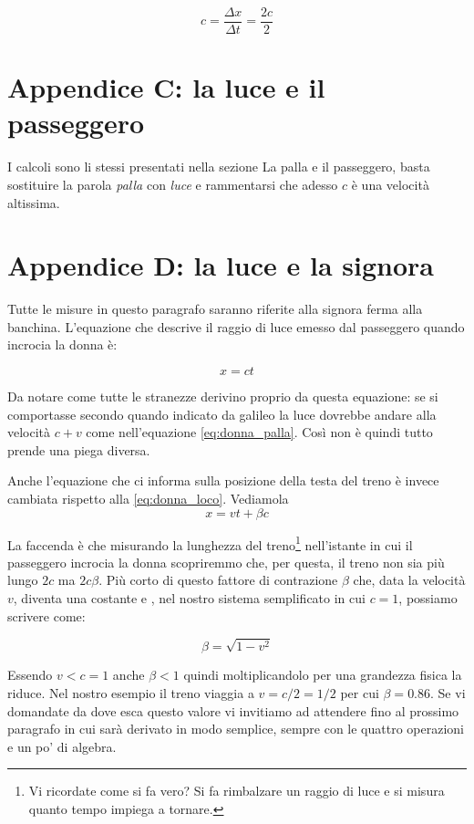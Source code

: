 $$ c =\frac{\Delta x}{\Delta t} = \frac{2c}{2} $$


\section{Appendice C: la luce e il passeggero}

I calcoli sono li stessi presentati nella sezione La palla e il passeggero, basta sostituire la parola \textit{palla} con \textit{luce} e rammentarsi che adesso $c$ è una velocità altissima. 

\section{Appendice D: la luce e la signora}
Tutte le misure in questo paragrafo saranno riferite alla signora ferma alla banchina. L'equazione che descrive il raggio di luce emesso dal passeggero quando incrocia la donna è:

\begin{equation} \label{eq:donna_luce} 
  x=ct
\end{equation}

Da notare come tutte le stranezze derivino proprio da questa equazione: se si comportasse secondo quando indicato da galileo la luce dovrebbe andare alla velocità $c+v$ come nell'equazione \ref{eq:donna_palla}. Così non è quindi tutto prende una piega diversa.

Anche l'equazione che ci informa sulla posizione della testa del treno è invece cambiata rispetto alla  \ref{eq:donna_loco}. Vediamola
\begin{equation} \label{eq:donna_loco2} 
   x=vt+\beta c
\end{equation}

La faccenda è che misurando la lunghezza del treno\footnote{Vi ricordate come si fa vero? Si fa rimbalzare un raggio di luce e si misura quanto tempo impiega a tornare.} nell'istante in cui il passeggero incrocia la donna scopriremmo che, per questa, il treno non sia più lungo $2c$ ma $2c\beta$.  Più corto di questo fattore di contrazione $\beta$ che, data la velocità $v$, diventa una costante e , nel nostro sistema semplificato in cui $c=1$, possiamo scrivere come:

$$ \beta = \sqrt{1-v^2} $$   

Essendo $v<c=1$ anche $\beta<1$ quindi moltiplicandolo per una grandezza fisica la riduce. Nel nostro esempio il treno viaggia a $v=c/2=1/2$ per cui $\beta=0.86$. Se vi domandate da dove esca questo valore vi invitiamo ad attendere fino al prossimo paragrafo in cui sarà derivato in modo semplice, sempre con le quattro operazioni e un po' di algebra.

